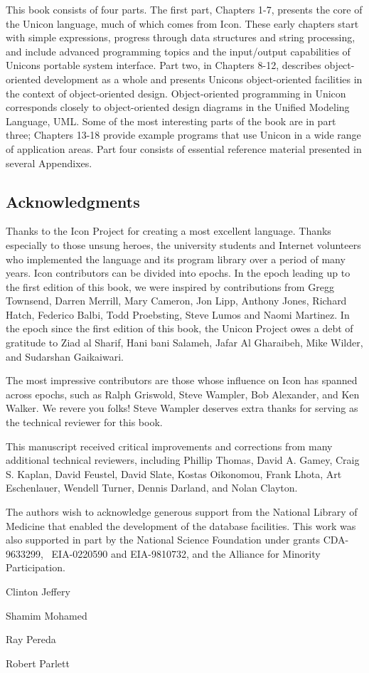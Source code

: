 This book consists of four parts. The first part, Chapters 1-7, presents
the core of the Unicon language, much of which comes from Icon. These
early chapters start with simple expressions, progress through data
structures and string processing, and include advanced programming
topics and the input/output capabilities of Unicon{\textquotesingle}s
portable system interface. Part two, in Chapters 8-12, describes
object-oriented development as a whole and presents
Unicon{\textquotesingle}s object-oriented facilities in the context of
object-oriented design. Object-oriented programming in Unicon
corresponds closely to object-oriented design diagrams in the Unified
Modeling Language, UML. Some of the most interesting parts of the book
are in part three; Chapters 13-18 provide example programs that use
Unicon in a wide range of application areas. Part four consists of
essential reference material presented in several Appendixes.

\subsection{Acknowledgments}

Thanks to the Icon Project for creating a most excellent language.
Thanks especially to those unsung heroes, the university students and
Internet volunteers who implemented the language and its
program library over a period of many years. Icon contributors can be
divided into epochs. In the epoch leading up to the first edition of
this book, we were inspired by
contributions from Gregg Townsend, Darren Merrill, Mary Cameron, Jon
Lipp, Anthony Jones, Richard Hatch, Federico Balbi, Todd Proebsting,
Steve Lumos and Naomi Martinez.  In the epoch since the first edition
of this book, the Unicon Project owes a debt of gratitude to Ziad al
Sharif, Hani bani Salameh, Jafar Al Gharaibeh, Mike Wilder, and Sudarshan
Gaikaiwari.

The most impressive contributors are those whose influence on Icon has
spanned across epochs, such as Ralph Griswold, Steve Wampler, Bob
Alexander, and Ken Walker. We revere you folks! Steve Wampler deserves
extra thanks for serving as the technical reviewer for this book.

This manuscript received critical improvements and corrections from many
additional technical reviewers, including Phillip Thomas, David A.
Gamey, Craig S. Kaplan, David Feustel, David Slate, Kostas Oikonomou,
Frank Lhota, Art Eschenlauer, Wendell Turner, Dennis Darland, and Nolan
Clayton.

The authors wish to acknowledge generous support from the National
Library of Medicine that enabled the development of the database
facilities. This work was also supported in part by the National
Science Foundation under grants CDA-9633299, \ EIA-0220590 and
EIA-9810732, and the Alliance for Minority Participation.

Clinton Jeffery

Shamim Mohamed

Ray Pereda

Robert Parlett
